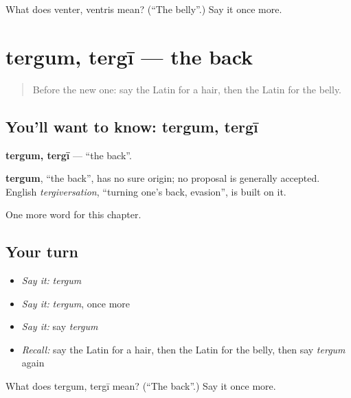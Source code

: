 \begin{tcolorbox}[breakable,colback=teal!4,colframe=teal!35!black,title={Before you move on}]
What does venter, ventris mean? (\textquotedblleft{}The belly\textquotedblright{}.) Say it once more.
\end{tcolorbox}
\section[tergum, tergī]{tergum, tergī — the back}

\label{lesson:LA-C65-tergum}



\begin{quote}
Before the new one: say the Latin for a hair, then the Latin for the belly.
\end{quote}

\subsection*{You'll want to know: tergum, tergī}
\textbf{tergum, tergī} — \textquotedblleft{}the back\textquotedblright{}.

\begin{cousinweb}
\textbf{tergum}, \textquotedblleft{}the back\textquotedblright{}, has no sure origin; no proposal is generally accepted. English \emph{tergiversation}, \textquotedblleft{}turning one's back, evasion\textquotedblright{}, is built on it.
\end{cousinweb}

\begin{grammarlens}[title={What you've built}]
One more word for this chapter.
\end{grammarlens}

\subsection*{Your turn}
\begin{itemize}
\raggedright
  \item \emph{Say it:} \emph{tergum}
  \item \emph{Say it:} \emph{tergum}, once more
  \item \emph{Say it:} say \emph{tergum}
  \item \emph{Recall:} say the Latin for a hair, then the Latin for the belly, then say \emph{tergum} again
\end{itemize}

\begin{tcolorbox}[breakable,colback=teal!4,colframe=teal!35!black,title={Before you move on}]
What does tergum, tergī mean? (\textquotedblleft{}The back\textquotedblright{}.) Say it once more.
\end{tcolorbox}
